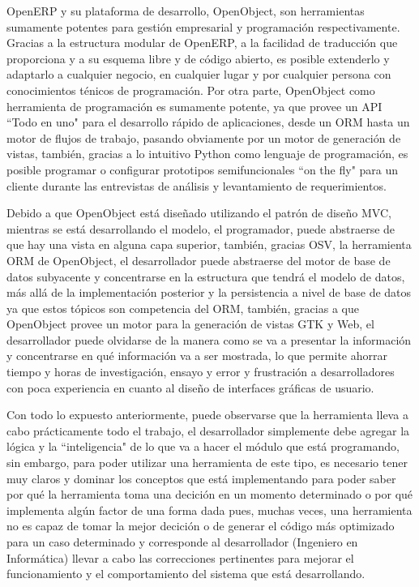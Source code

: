 \documentclass[a4paper, 12pt]{article}
\begin{document}
OpenERP y su plataforma de desarrollo, OpenObject, son herramientas sumamente potentes para gestión empresarial y programación respectivamente. Gracias a la estructura modular de OpenERP, a la facilidad de traducción que proporciona y a su esquema libre y de código abierto, es posible extenderlo y adaptarlo a cualquier negocio, en cualquier lugar y por cualquier persona con conocimientos ténicos de programación. Por otra parte, OpenObject como herramienta de programación es sumamente potente, ya que provee un API ``Todo en uno" para el desarrollo rápido de aplicaciones, desde un ORM hasta un motor de flujos de trabajo, pasando obviamente por un motor de generación de vistas, también, gracias a lo intuitivo Python como lenguaje de programación, es posible programar o configurar prototipos semifuncionales ``on the fly" para un cliente durante las entrevistas de análisis y levantamiento de requerimientos.

Debido a que OpenObject está diseñado utilizando el patrón de diseño MVC, mientras se está desarrollando el modelo, el programador, puede abstraerse de que hay una vista en alguna capa superior, también, gracias OSV, la herramienta ORM de OpenObject, el desarrollador puede abstraerse del motor de base de datos subyacente y concentrarse en la estructura que tendrá el modelo de datos, más allá de la implementación posterior y la persistencia a nivel de base de datos ya que estos tópicos son competencia del ORM, también, gracias a que OpenObject provee un motor para la generación de vistas GTK y Web, el desarrollador puede olvidarse de la manera como se va a presentar la información y concentrarse en qué información va a ser mostrada, lo que permite ahorrar tiempo y horas de investigación, ensayo y error y frustración a desarrolladores con poca experiencia en cuanto al diseño de interfaces gráficas de usuario.

Con todo lo expuesto anteriormente, puede observarse que la herramienta lleva a cabo prácticamente todo el trabajo, el desarrollador simplemente debe agregar la lógica y la ``inteligencia" de lo que va a hacer el módulo que está programando, sin embargo, para poder utilizar una herramienta de este tipo, es necesario tener muy claros y dominar los conceptos que está implementando para poder saber por qué la herramienta toma una decición en un momento determinado o por qué implementa algún factor de una forma dada pues, muchas veces, una herramienta no es capaz de tomar la mejor decición o de generar el código más optimizado para un caso determinado y corresponde al desarrollador (Ingeniero en Informática) llevar a cabo las correcciones pertinentes para mejorar el funcionamiento y el comportamiento del sistema que está desarrollando.
\end{document}
